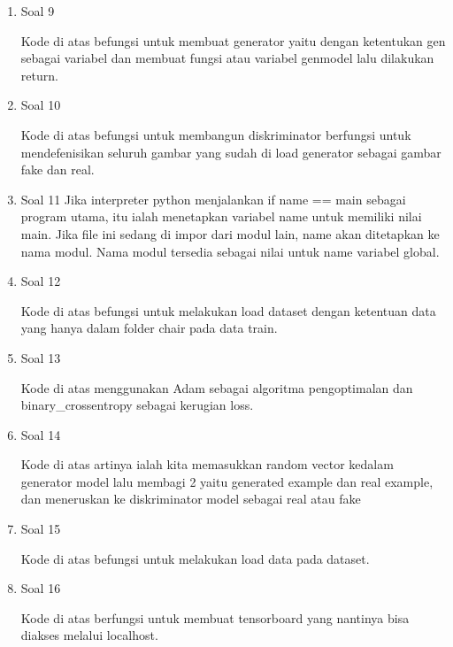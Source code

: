\begin{enumerate}
	\item Soal 9
	\hfill\break
	
	Kode di atas befungsi untuk membuat generator yaitu dengan ketentukan gen sebagai variabel dan membuat fungsi atau variabel genmodel lalu dilakukan return. 
	
	\item Soal 10
	\hfill\break
	
	Kode di atas befungsi untuk membangun diskriminator berfungsi untuk mendefenisikan seluruh gambar yang sudah di load generator sebagai gambar fake dan real.

	\item Soal 11
	\hfill\break
	Jika interpreter python menjalankan if name == main sebagai program utama, itu ialah menetapkan variabel name untuk memiliki nilai main. Jika file ini sedang di impor dari modul lain, name akan ditetapkan ke nama modul. Nama modul tersedia sebagai nilai untuk name variabel global.

	\item Soal 12
	\hfill\break
	
	Kode di atas befungsi untuk melakukan load dataset dengan ketentuan data yang hanya dalam folder chair pada data train.

	\item Soal 13
	\hfill\break
	
	Kode di atas menggunakan Adam sebagai algoritma pengoptimalan dan binary\_crossentropy sebagai kerugian loss. 

	\item Soal 14
	\hfill\break
	
	Kode di atas artinya ialah kita memasukkan random vector kedalam generator model lalu membagi 2 yaitu generated example dan real example, dan meneruskan ke diskriminator model sebagai real atau fake

	\item Soal 15
	\hfill\break
	
	Kode di atas befungsi untuk melakukan load data pada dataset.

	\item Soal 16
	\hfill\break
	
	Kode di atas berfungsi untuk membuat tensorboard yang nantinya bisa diakses melalui localhost.


\end{enumerate}
